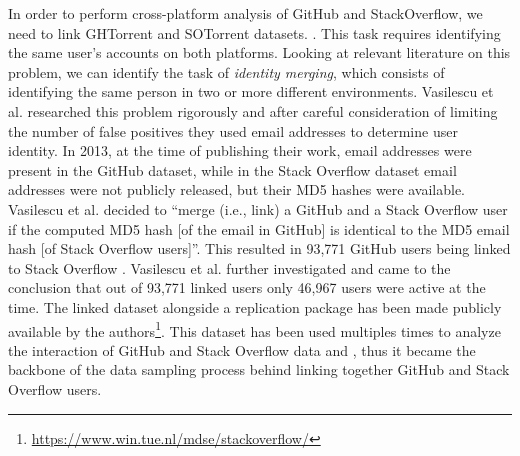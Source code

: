        In order to perform cross-platform analysis of GitHub and StackOverflow,  we need to link  GHTorrent and SOTorrent datasets. . This task requires identifying the same user's accounts on both platforms. Looking at relevant literature on this problem, we can identify the task of \textit{identity merging}, which consists of identifying the same person in two or more different environments. Vasilescu et al. \cite{vasilescu2013stackoverflow} researched this problem rigorously and after careful consideration of limiting the number of false positives they used email addresses to determine user identity. In 2013, at the time of publishing their work, email addresses were present in the GitHub dataset, while in the Stack Overflow dataset email addresses were not publicly released, but their MD5 hashes were available. Vasilescu et al. \cite{vasilescu2013stackoverflow} decided to ``merge (i.e., link) a GitHub and a Stack Overflow user if the computed MD5 hash [of the email in GitHub] is identical to the MD5 email hash [of Stack Overflow users]''. This resulted in 93,771 GitHub users being linked to Stack Overflow . Vasilescu et al. \cite{vasilescu2013stackoverflow} further investigated and came to the conclusion that out of 93,771 linked users only 46,967 users were active at the time. The linked dataset alongside a replication package has been made publicly available by the authors\footnote{\label{bodgan_dataset}\url{https://www.win.tue.nl/mdse/stackoverflow/}}. This dataset has been used multiples times to analyze the interaction of GitHub and Stack Overflow data \cite{badashian2014involvement} and \cite{lee2017github}, thus it became the backbone of the data sampling process behind linking together GitHub and Stack Overflow users.  

